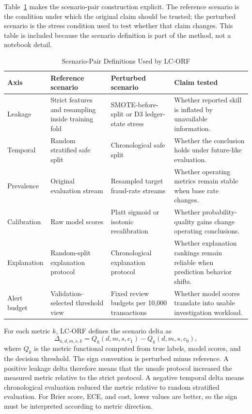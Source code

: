\documentclass{ieeeaccess}
\begin{document}
Table~\ref{tab:scenario_pairs} makes the scenario-pair construction explicit. The reference scenario is the condition under which the original claim should be trusted; the perturbed scenario is the stress condition used to test whether that claim changes. This table is included because the scenario definition is part of the method, not a notebook detail.

\begin{table}[!htbp]
\caption{Scenario-Pair Definitions Used by LC-ORF}
\label{tab:scenario_pairs}
\centering
\scriptsize
\setlength{\tabcolsep}{2pt}
\renewcommand{\arraystretch}{1.08}
\begin{tabularx}{\columnwidth}{|>{\raggedright\arraybackslash}p{}|>{\raggedright\arraybackslash}p{}|>{\raggedright\arraybackslash}p{}|>{\raggedright\arraybackslash}X|}
\hline
\textbf{Axis} & \textbf{Reference scenario} & \textbf{Perturbed scenario} & \textbf{Claim tested}\\
\hline
Leakage & Strict features and resampling inside training fold & SMOTE-before-split or D3 ledger-state stress & Whether reported skill is inflated by unavailable information.\\
\hline
Temporal & Random stratified safe split & Chronological safe split & Whether the conclusion holds under future-like evaluation.\\
\hline
Prevalence & Original evaluation stream & Resampled target fraud-rate streams & Whether operating metrics remain stable when base rate changes.\\
\hline
Calibration & Raw model scores & Platt sigmoid or isotonic recalibration & Whether probability-quality gains change operating conclusions.\\
\hline
Explanation & Random-split explanation protocol & Chronological explanation protocol & Whether explanation rankings remain reliable when prediction behavior shifts.\\
\hline
Alert budget & Validation-selected threshold view & Fixed review budgets per 10,000 transactions & Whether model scores translate into usable investigation workload.\\
\hline
\end{tabularx}
\end{table}

For each metric $k$, LC-ORF defines the scenario delta as
\begin{equation}
\Delta_{a,d,m,s,k}
= Q_k(d,m,s,c_1) - Q_k(d,m,s,c_0),
\label{eq:delta}
\end{equation}
where $Q_k$ is the metric functional computed from true labels, model scores, and the decision threshold. The sign convention is perturbed minus reference. A positive leakage delta therefore means that the unsafe protocol increased the measured metric relative to the strict protocol. A negative temporal delta means chronological evaluation reduced the metric relative to random stratified evaluation. For Brier score, ECE, and cost, lower values are better, so the sign must be interpreted according to metric direction.
\end{document}
